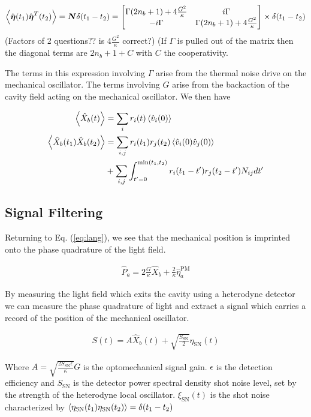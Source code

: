 \documentclass[12pt]{article}
\newcommand{\bv}[1]{\boldsymbol{#1}}
\newcommand{\nn}{\nonumber}
\begin{document}
\begin{align}
\Braket{\hat{\bv{\eta}}(t_1)\hat{\bv{\eta}}^T(t_2)} = \bv{N}\delta(t_1-t_2) = \begin{bmatrix}
\Gamma(2 n_b + 1) + 4 \frac{G^2}{\kappa} & i \Gamma\\
-i \Gamma & \Gamma(2n_b+1) + 4 \frac{G^2}{\kappa}
\end{bmatrix}
 \times \delta(t_1-t_2)
\end{align}
(Factors of 2 questions?? is $4\frac{G^2}{\kappa}$ correct?)
(If $\Gamma$ is pulled out of the matrix then the diagonal terms are $2n_b +1 + C$ with $C$ the cooperativity.

The terms in this expression involving $\Gamma$ arise from the thermal noise drive on the mechanical oscillator. The terms involving $G$ arise from the backaction of the cavity field acting on the mechanical oscillator.
We then have

\begin{align}
\Braket{\hat{X}_b(t)} &= \sum_{i} r_i(t)\Braket{\hat{v}_i(0)}\\
\Braket{\hat{X}_b(t_1)\hat{X}_b(t_2)} &= \sum_{i,j} r_i(t_1) r_j(t_2) \Braket{\hat{v}_i(0)\hat{v}_j(0)} \nn \\
&+\sum_{i,j} \int_{t'=0}^{\text{min}(t_1,t_2)} r_i(t_1-t')r_j(t_2-t') N_{ij} dt' \nn 
\end{align}

\subsection{Signal Filtering}
Returning to Eq. (\ref{eq:lang}), we see that the mechanical position is imprinted onto the phase quadrature of the light field.

\begin{align}
\hat{P}_a = 2 \frac{G}{\kappa} \hat{X}_b + \frac{2}{\kappa} \hat{\eta}^{\text{PM}}_a
\end{align}

By measuring the light field which exits the cavity using a heterodyne detector we can measure the phase quadrature of light and extract a signal which carries a record of the position of the mechanical oscillator.

\begin{align}
S(t) = A \hat{X}_b(t) + \sqrt{\frac{S_{\text{SN}}}{2}} \eta_{\text{SN}}(t)
\end{align}

Where $A = \sqrt{\frac{2 S_{\text{SN}} \epsilon}{\kappa}}G$ is the optomechanical signal gain. $\epsilon$ is the detection efficiency and $S_{\text{SN}}$ is the detector power spectral density shot noise level, set by the strength of the heterodyne local oscillator. $\xi_{\text{SN}}(t)$ is the shot noise characterized by $\Braket{\eta_{\text{SN}}(t_1)\eta_{\text{SN}}(t_2)} = \delta(t_1-t_2)$
\end{document}
